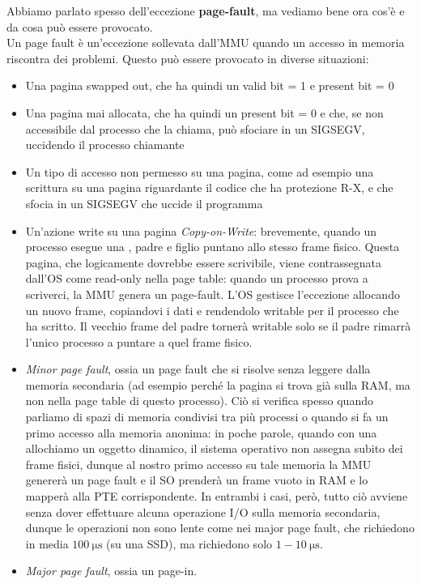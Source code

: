 \documentclass[11pt, a4paper, titlepage, oneside]{scrbook}
\begin{document}
Abbiamo parlato spesso dell'eccezione \textbf{page-fault}, ma vediamo bene ora cos'è e da cosa può essere provocato. \\
Un page fault è un'eccezione sollevata dall'MMU quando un accesso in memoria riscontra dei problemi. Questo può essere provocato in diverse situazioni:
\begin{itemize}
    \item Una pagina swapped out, che ha quindi un valid bit = 1 e present bit = 0 
    \item Una pagina mai allocata, che ha quindi un present bit = 0 e che, se non accessibile dal processo che la chiama, può sfociare in un SIGSEGV, uccidendo il processo chiamante
    \item Un tipo di accesso non permesso su una pagina, come ad esempio una scrittura su una pagina riguardante il codice che ha protezione R-X, e che sfocia in un SIGSEGV che uccide il programma
    \item Un'azione write su una pagina \textit{Copy-on-Write}: brevemente, quando un processo esegue una , padre e figlio puntano allo stesso frame fisico. Questa pagina, che logicamente dovrebbe essere scrivibile, viene contrassegnata dall'OS come read-only nella page table: quando un processo prova a scriverci, la MMU genera un page-fault. L'OS gestisce l'eccezione allocando un nuovo frame, copiandovi i dati e rendendolo writable per il processo che ha scritto. Il vecchio frame del padre tornerà writable solo se il padre rimarrà l'unico processo a puntare a quel frame fisico.
    \item \textit{Minor page fault}, ossia un page fault che si risolve senza leggere dalla memoria secondaria (ad esempio perché la pagina si trova già sulla RAM, ma non nella page table di questo processo). Ciò si verifica spesso quando parliamo di spazi di memoria condivisi tra più processi o quando si fa un primo accesso alla memoria anonima: in poche parole, quando con una  allochiamo un oggetto dinamico, il sistema operativo non assegna subito dei frame fisici, dunque al nostro primo accesso su tale memoria la MMU genererà un page fault e il SO prenderà un frame vuoto in RAM e lo mapperà alla PTE corrispondente. In entrambi i casi, però, tutto ciò avviene senza dover effettuare alcuna operazione I/O sulla memoria secondaria, dunque le operazioni non sono lente come nei major page fault, che richiedono in media $\SI{100}{\micro\second}$ (su una SSD), ma richiedono solo $1-\SI{10}{\micro\second}$.
    \item \textit{Major page fault}, ossia un page-in.
\end{itemize}
\end{document}
